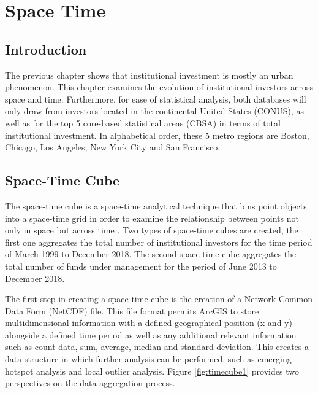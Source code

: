 \chapter{Space Time}	
\label{chapterIV}
\section{Introduction}

The previous chapter shows that institutional investment is mostly an urban phenomenon.  This chapter examines the evolution of institutional investors across space and time.  Furthermore, for ease of statistical analysis, both databases will only draw from investors located in the continental United States (CONUS), as well as for the top 5 core-based statistical areas (CBSA) in terms of total institutional investment.  In alphabetical order, these 5 metro regions are Boston, Chicago, Los Angeles, New York City and San Francisco.  


\section{Space-Time Cube}

The space-time cube is a space-time analytical technique that bins point objects into a space-time grid in order to examine the relationship between points not only in space but across time \cite{Esri}. Two types of space-time cubes are created, the first one aggregates the total number of institutional investors for the time period of March 1999 to December 2018.  The second space-time cube aggregates the total number of funds under management for the period of June 2013 to December 2018.  

The first step in creating a space-time cube is the creation of a Network Common Data Form (NetCDF) file.   This file format permits ArcGIS to store multidimensional information with a defined geographical position (x and y) alongside a defined time period as well as any additional relevant information such as count data, sum, average, median and standard deviation.  This creates a data-structure in which further analysis can be performed, such as emerging hotspot analysis and local outlier analysis. Figure \ref{fig:timecube1} provides two perspectives on the data aggregation process. 

